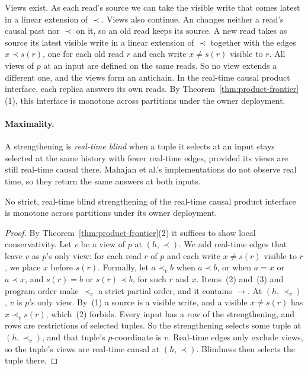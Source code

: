 Views exist.  As each read's source we can take the visible write that comes
latest in a linear extension of $\prec$.  Views also continue.  An \indesc
changes neither a read's causal past nor $\prec$ on it, so an old read keeps
its source.  A new read takes as source its latest visible write in a linear
extension of $\prec$ together with the edges $x\prec s(r)$, one for each old
read $r$ and each write $x\ne s(r)$ visible to $r$.  All views of $p$ at an
input are defined on the same reads.  So no view extends a different one, and
the views form an antichain.  In the real-time causal product interface, each
replica answers its own reads.  By Theorem~\ref{thm:product-frontier}(1), this
interface is monotone across partitions under the owner deployment.

\paragraph{Maximality.}
A strengthening is \emph{real-time blind} when a tuple it selects at an input
stays selected at the same history with fewer real-time edges, provided its
views are still real-time causal there.  Mahajan et al.'s implementations do
not observe real time, so they return the same answers at both inputs.

\begin{proposition}
\label{prop:rtc-maximal}
No strict, real-time blind strengthening of the real-time causal product
interface is monotone across partitions under its owner deployment.
\end{proposition}

\begin{proof}
By Theorem~\ref{thm:product-frontier}(2) it suffices to show local
conservativity.  Let $v$ be a view of $p$ at $(h,\prec)$.  We add real-time
edges that leave $v$ as $p$'s only view: for each read $r$ of $p$ and each
write $x\ne s(r)$ visible to $r$, we place $x$ before $s(r)$.  Formally, let
$a\prec_v b$ when $a\prec b$, or when $a=x$ or $a\prec x$, and $s(r)=b$ or
$s(r)\prec b$, for such $r$ and $x$.  Items~(2) and~(3) and program order make
$\prec_v$ a strict partial order, and it contains $\to$.  At $(h,\prec_v)$,
$v$ is $p$'s only view.  By~(1) a source is a visible write, and a visible
$x\ne s(r)$ has $x\prec_v s(r)$, which~(2) forbids.  Every input has a row of
the strengthening, and rows are restrictions of selected tuples.  So the
strengthening selects some tuple at $(h,\prec_v)$, and that tuple's
$p$-coordinate is $v$.  Real-time edges only exclude views, so the tuple's
views are real-time causal at $(h,\prec)$.  Blindness then selects the tuple
there.
\end{proof}

